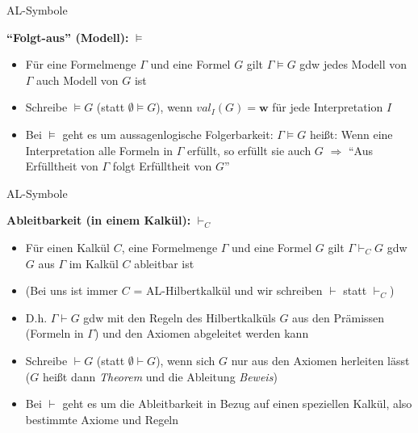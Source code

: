 \begin{frame}{AL-Symbole}

	\textbf{\enquote{Folgt-aus} (Modell):} $\models$ \begin{itemize}
		\item Für eine Formelmenge $\Gamma$ und eine Formel $G$ gilt $\Gamma \models G$ gdw jedes Modell von $\Gamma$ auch Modell von $G$ ist
		\item Schreibe $\models G$ (statt $\emptyset \models G$), wenn $val_I(G) = \mathbf{w}$ für jede Interpretation $I$
		\item Bei $\models$ geht es um aussagenlogische Folgerbarkeit: $\Gamma \models G$ heißt: Wenn eine Interpretation alle Formeln in $\Gamma$ erfüllt, so erfüllt sie auch $G$ $\Rightarrow$ \enquote{Aus Erfülltheit von $\Gamma$ folgt Erfülltheit von $G$}
	\end{itemize}

\end{frame}

\begin{frame}{AL-Symbole}

	\textbf{Ableitbarkeit (in einem Kalkül):} $\vdash_C$ \begin{itemize}
		\item Für einen Kalkül $C$, eine Formelmenge $\Gamma$ und eine Formel $G$ gilt $\Gamma \vdash_C G$ gdw $G$ aus $\Gamma$ im Kalkül $C$ ableitbar ist
		\item (Bei uns ist immer $C$ = AL-Hilbertkalkül und wir schreiben $\vdash$ statt $\vdash_C$)
		\item D.h. $\Gamma \vdash G$ gdw mit den Regeln des Hilbertkalküls $G$ aus den Prämissen (Formeln in $\Gamma$) und den Axiomen abgeleitet werden kann
		\item Schreibe $\vdash G$ (statt $\emptyset \vdash G$), wenn sich $G$ nur aus den Axiomen herleiten lässt ($G$ heißt dann \textit{Theorem} und die Ableitung \textit{Beweis})
		\item Bei $\vdash$ geht es um die Ableitbarkeit in Bezug auf einen speziellen Kalkül, also bestimmte Axiome und Regeln
	\end{itemize}

\end{frame}
	
